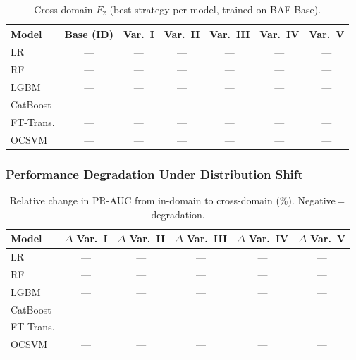 \begin{table}[ht]
\centering
\caption{Cross-domain $F_2$ (best strategy per model, trained on BAF Base).}
\label{tab:crossdomain_f2}
\begin{tabular}{l c c c c c c}
\toprule
Model & Base (ID) & Var.~I & Var.~II & Var.~III & Var.~IV & Var.~V \\
\midrule
LR        & --- & --- & --- & --- & --- & --- \\
RF        & --- & --- & --- & --- & --- & --- \\
LGBM      & --- & --- & --- & --- & --- & --- \\
CatBoost  & --- & --- & --- & --- & --- & --- \\
FT-Trans. & --- & --- & --- & --- & --- & --- \\
OCSVM     & --- & --- & --- & --- & --- & --- \\
\bottomrule
\end{tabular}
\end{table}

\subsubsection{Performance Degradation Under Distribution Shift}

\begin{table}[ht]
\centering
\caption{Relative change in PR-AUC from in-domain to cross-domain (\%).
  Negative\,=\,degradation.}
\label{tab:crossdomain_delta}
\begin{tabular}{l c c c c c}
\toprule
Model & $\Delta$ Var.~I & $\Delta$ Var.~II & $\Delta$ Var.~III & $\Delta$ Var.~IV & $\Delta$ Var.~V \\
\midrule
LR        & ---  & ---  & ---  & ---  & ---  \\
RF        & ---  & ---  & ---  & ---  & ---  \\
LGBM      & ---  & ---  & ---  & ---  & ---  \\
CatBoost  & ---  & ---  & ---  & ---  & ---  \\
FT-Trans. & ---  & ---  & ---  & ---  & ---  \\
OCSVM     & ---  & ---  & ---  & ---  & ---  \\
\bottomrule
\end{tabular}
\end{table}


